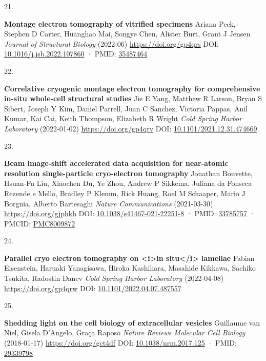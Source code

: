 \documentclass[
]{article}
\newlength{\cslhangindent}
\newlength{\csllabelwidth}
\newlength{\cslentryspacingunit} %
\newenvironment{CSLReferences}[2] %
 {%
  \setlength{\parindent}{0pt}
  \ifodd #1
  \let\oldpar\par
  \def\par{\hangindent=\cslhangindent\oldpar}
  \fi
  \setlength{\parskip}{#2\cslentryspacingunit}
 }%
 {}
\newcommand{\CSLBlock}[1]{#1\hfill\break}
\newcommand{\CSLLeftMargin}[1]{\parbox[t]{\csllabelwidth}{#1}}
\newcommand{\CSLRightInline}[1]{\parbox[t]{\linewidth - \csllabelwidth}{#1}\break}
\begin{document}
\begin{CSLReferences}{0}{0}
\leavevmode{}%
\CSLLeftMargin{21. }%
\CSLRightInline{\textbf{Montage electron tomography of vitrified specimens}
\CSLBlock{Ariana Peck, Stephen D Carter, Huanghao Mai, Songye Chen, Alister Burt, Grant J Jensen} \emph{Journal of Structural Biology} (2022-06) \url{https://doi.org/gp4qrs}
\CSLBlock{DOI: \href{https://doi.org/10.1016/j.jsb.2022.107860}{10.1016/j.jsb.2022.107860} · PMID: \href{https://www.ncbi.nlm.nih.gov/pubmed/35487464}{35487464}}}

\leavevmode{}%
\CSLLeftMargin{22. }%
\CSLRightInline{\textbf{Correlative cryogenic montage electron tomography for comprehensive in-situ whole-cell structural studies}
\CSLBlock{Jie E Yang, Matthew R Larson, Bryan S Sibert, Joseph Y Kim, Daniel Parrell, Juan C Sanchez, Victoria Pappas, Anil Kumar, Kai Cai, Keith Thompson, Elizabeth R Wright} \emph{Cold Spring Harbor Laboratory} (2022-01-02) \url{https://doi.org/gp4qrv}
\CSLBlock{DOI: \href{https://doi.org/10.1101/2021.12.31.474669}{10.1101/2021.12.31.474669}}}

\leavevmode{}%
\CSLLeftMargin{23. }%
\CSLRightInline{\textbf{Beam image-shift accelerated data acquisition for near-atomic resolution single-particle cryo-electron tomography}
\CSLBlock{Jonathan Bouvette, Hsuan-Fu Liu, Xiaochen Du, Ye Zhou, Andrew P Sikkema, Juliana da Fonseca Rezende e Mello, Bradley P Klemm, Rick Huang, Roel M Schaaper, Mario J Borgnia, Alberto Bartesaghi} \emph{Nature Communications} (2021-03-30) \url{https://doi.org/gjphkb}
\CSLBlock{DOI: \href{https://doi.org/10.1038/s41467-021-22251-8}{10.1038/s41467-021-22251-8} · PMID: \href{https://www.ncbi.nlm.nih.gov/pubmed/33785757}{33785757} · PMCID: \href{https://www.ncbi.nlm.nih.gov/pmc/articles/PMC8009872}{PMC8009872}}}

\leavevmode{}%
\CSLLeftMargin{24. }%
\CSLRightInline{\textbf{Parallel cryo electron tomography on \textless i\textgreater in situ\textless/i\textgreater{} lamellae}
\CSLBlock{Fabian Eisenstein, Haruaki Yanagisawa, Hiroka Kashihara, Masahide Kikkawa, Sachiko Tsukita, Radostin Danev} \emph{Cold Spring Harbor Laboratory} (2022-04-08) \url{https://doi.org/gp4qrw}
\CSLBlock{DOI: \href{https://doi.org/10.1101/2022.04.07.487557}{10.1101/2022.04.07.487557}}}

\leavevmode{}%
\CSLLeftMargin{25. }%
\CSLRightInline{\textbf{Shedding light on the cell biology of extracellular vesicles}
\CSLBlock{Guillaume van Niel, Gisela D'Angelo, Graça Raposo} \emph{Nature Reviews Molecular Cell Biology} (2018-01-17) \url{https://doi.org/gct4df}
\CSLBlock{DOI: \href{https://doi.org/10.1038/nrm.2017.125}{10.1038/nrm.2017.125} · PMID: \href{https://www.ncbi.nlm.nih.gov/pubmed/29339798}{29339798}}}


\end{CSLReferences}
\end{document}
